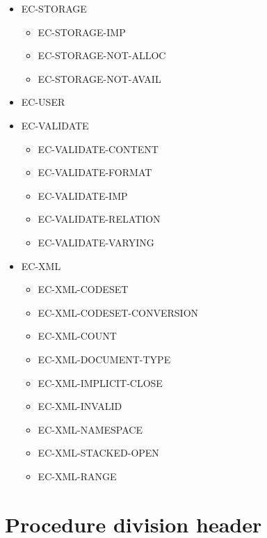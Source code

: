 \begin{itemize}
\item EC-STORAGE
  \begin{itemize}
  \item EC-STORAGE-IMP
  \item EC-STORAGE-NOT-ALLOC
  \item EC-STORAGE-NOT-AVAIL
  \end{itemize}

\item EC-USER

\item EC-VALIDATE
  \begin{itemize}
  \item EC-VALIDATE-CONTENT
  \item EC-VALIDATE-FORMAT
  \item EC-VALIDATE-IMP
  \item EC-VALIDATE-RELATION
  \item EC-VALIDATE-VARYING
  \end{itemize}

\item EC-XML
  \begin{itemize}
  \item EC-XML-CODESET
  \item EC-XML-CODESET-CONVERSION
  \item EC-XML-COUNT
  \item EC-XML-DOCUMENT-TYPE
  \item EC-XML-IMPLICIT-CLOSE
  \item EC-XML-INVALID
  \item EC-XML-NAMESPACE
  \item EC-XML-STACKED-OPEN
  \item EC-XML-RANGE
  \end{itemize}
\end{itemize}

\section{Procedure division header}


